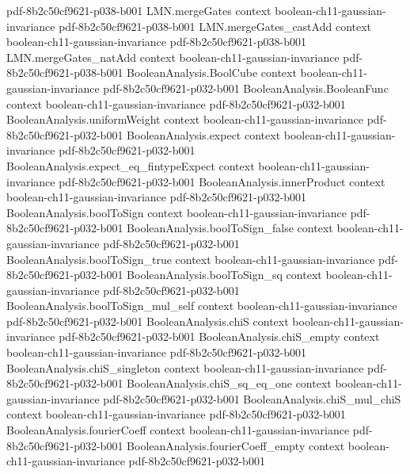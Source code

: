 \begin{theorem}
  {pdf-8b2c50cf9621-p038-b001}
\proofstep
  {LMN.mergeGates}
  {context}
  {boolean-ch11-gaussian-invariance}
  {pdf-8b2c50cf9621-p038-b001}
\proofstep
  {LMN.mergeGates_castAdd}
  {context}
  {boolean-ch11-gaussian-invariance}
  {pdf-8b2c50cf9621-p038-b001}
\proofstep
  {LMN.mergeGates_natAdd}
  {context}
  {boolean-ch11-gaussian-invariance}
  {pdf-8b2c50cf9621-p038-b001}
\proofstep
  {BooleanAnalysis.BoolCube}
  {context}
  {boolean-ch11-gaussian-invariance}
  {pdf-8b2c50cf9621-p032-b001}
\proofstep
  {BooleanAnalysis.BooleanFunc}
  {context}
  {boolean-ch11-gaussian-invariance}
  {pdf-8b2c50cf9621-p032-b001}
\proofstep
  {BooleanAnalysis.uniformWeight}
  {context}
  {boolean-ch11-gaussian-invariance}
  {pdf-8b2c50cf9621-p032-b001}
\proofstep
  {BooleanAnalysis.expect}
  {context}
  {boolean-ch11-gaussian-invariance}
  {pdf-8b2c50cf9621-p032-b001}
\proofstep
  {BooleanAnalysis.expect_eq_fintypeExpect}
  {context}
  {boolean-ch11-gaussian-invariance}
  {pdf-8b2c50cf9621-p032-b001}
\proofstep
  {BooleanAnalysis.innerProduct}
  {context}
  {boolean-ch11-gaussian-invariance}
  {pdf-8b2c50cf9621-p032-b001}
\proofstep
  {BooleanAnalysis.boolToSign}
  {context}
  {boolean-ch11-gaussian-invariance}
  {pdf-8b2c50cf9621-p032-b001}
\proofstep
  {BooleanAnalysis.boolToSign_false}
  {context}
  {boolean-ch11-gaussian-invariance}
  {pdf-8b2c50cf9621-p032-b001}
\proofstep
  {BooleanAnalysis.boolToSign_true}
  {context}
  {boolean-ch11-gaussian-invariance}
  {pdf-8b2c50cf9621-p032-b001}
\proofstep
  {BooleanAnalysis.boolToSign_sq}
  {context}
  {boolean-ch11-gaussian-invariance}
  {pdf-8b2c50cf9621-p032-b001}
\proofstep
  {BooleanAnalysis.boolToSign_mul_self}
  {context}
  {boolean-ch11-gaussian-invariance}
  {pdf-8b2c50cf9621-p032-b001}
\proofstep
  {BooleanAnalysis.chiS}
  {context}
  {boolean-ch11-gaussian-invariance}
  {pdf-8b2c50cf9621-p032-b001}
\proofstep
  {BooleanAnalysis.chiS_empty}
  {context}
  {boolean-ch11-gaussian-invariance}
  {pdf-8b2c50cf9621-p032-b001}
\proofstep
  {BooleanAnalysis.chiS_singleton}
  {context}
  {boolean-ch11-gaussian-invariance}
  {pdf-8b2c50cf9621-p032-b001}
\proofstep
  {BooleanAnalysis.chiS_sq_eq_one}
  {context}
  {boolean-ch11-gaussian-invariance}
  {pdf-8b2c50cf9621-p032-b001}
\proofstep
  {BooleanAnalysis.chiS_mul_chiS}
  {context}
  {boolean-ch11-gaussian-invariance}
  {pdf-8b2c50cf9621-p032-b001}
\proofstep
  {BooleanAnalysis.fourierCoeff}
  {context}
  {boolean-ch11-gaussian-invariance}
  {pdf-8b2c50cf9621-p032-b001}
\proofstep
  {BooleanAnalysis.fourierCoeff_empty}
  {context}
  {boolean-ch11-gaussian-invariance}
  {pdf-8b2c50cf9621-p032-b001}

\end{theorem}
